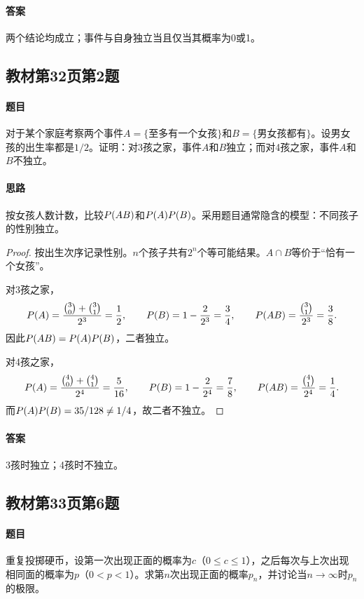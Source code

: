 \paragraph{答案}两个结论均成立；事件与自身独立当且仅当其概率为0或1。

\subsection{教材第32页第2题}
\label{ex:w04-t32-2}
\paragraph{题目}
对于某个家庭考察两个事件$A=\{\text{至多有一个女孩}\}$和$B=\{\text{男女孩都有}\}$。设男女孩的出生率都是$1/2$。证明：对3孩之家，事件$A$和$B$独立；而对4孩之家，事件$A$和$B$不独立。
\paragraph{思路}按女孩人数计数，比较$\P(AB)$和$\P(A)\P(B)$。采用题目通常隐含的模型：不同孩子的性别独立。
\begin{proof}
按出生次序记录性别。$n$个孩子共有$2^n$个等可能结果。$A\cap B$等价于“恰有一个女孩”。

对3孩之家，
\[
\P(A)=\frac{\binom30+\binom31}{2^3}=\frac12,
\qquad \P(B)=1-\frac2{2^3}=\frac34,
\qquad \P(AB)=\frac{\binom31}{2^3}=\frac38.
\]
因此$\P(AB)=\P(A)\P(B)$，二者独立。

对4孩之家，
\[
\P(A)=\frac{\binom40+\binom41}{2^4}=\frac5{16},
\qquad \P(B)=1-\frac2{2^4}=\frac78,
\qquad \P(AB)=\frac{\binom41}{2^4}=\frac14.
\]
而$\P(A)\P(B)=35/128\ne1/4$，故二者不独立。
\end{proof}
\paragraph{答案}3孩时独立；4孩时不独立。

\subsection{教材第33页第6题}
\label{ex:w04-t33-6}
\paragraph{题目}
重复投掷硬币，设第一次出现正面的概率为$c$（$0\leq c\leq1$），之后每次与上次出现相同面的概率为$p$（$0<p<1$）。求第$n$次出现正面的概率$p_n$，并讨论当$n\to\infty$时$p_n$的极限。

